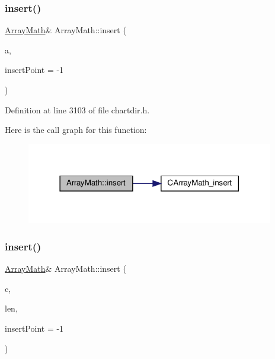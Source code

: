 \subsubsection{\texorpdfstring{insert()}{insert()}\hspace{0.1cm}{\footnotesize\ttfamily [1/2]}}
{\footnotesize\ttfamily \hyperlink{class_array_math}{Array\+Math}\& Array\+Math\+::insert (\begin{DoxyParamCaption}\item[{\hyperlink{class_double_array}{Double\+Array}}]{a,  }\item[{int}]{insert\+Point = {\ttfamily -\/1} }\end{DoxyParamCaption})\hspace{0.3cm}{\ttfamily [inline]}}



Definition at line 3103 of file chartdir.\+h.

Here is the call graph for this function\+:
\nopagebreak
\begin{figure}[H]
\begin{center}
\leavevmode
\includegraphics[width=306pt]{class_array_math_a36c129c503f3fe99e8a92ba265eae19e_cgraph}
\end{center}
\end{figure}
\mbox{\label{class_array_math_a2cebd29ee37fb8f24de84cbd14cd4b46}} 
\subsubsection{\texorpdfstring{insert()}{insert()}\hspace{0.1cm}{\footnotesize\ttfamily [2/2]}}
{\footnotesize\ttfamily \hyperlink{class_array_math}{Array\+Math}\& Array\+Math\+::insert (\begin{DoxyParamCaption}\item[{double}]{c,  }\item[{int}]{len,  }\item[{int}]{insert\+Point = {\ttfamily -\/1} }\end{DoxyParamCaption})\hspace{0.3cm}{\ttfamily [inline]}}




